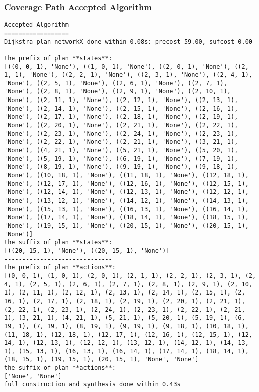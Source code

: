 \subsubsection*{Coverage Path Accepted Algorithm}
\begin{lstlisting}
Accepted Algorithm
==================
Dijkstra_plan_networkX done within 0.08s: precost 59.00, sufcost 0.00
------------------------------
the prefix of plan **states**:
[((0, 0, 1), 'None'), ((1, 0, 1), 'None'), ((2, 0, 1), 'None'), ((2, 1, 1), 'None'), ((2, 2, 1), 'None'), ((2, 3, 1), 'None'), ((2, 4, 1), 'None'), ((2, 5, 1), 'None'), ((2, 6, 1), 'None'), ((2, 7, 1), 'None'), ((2, 8, 1), 'None'), ((2, 9, 1), 'None'), ((2, 10, 1), 'None'), ((2, 11, 1), 'None'), ((2, 12, 1), 'None'), ((2, 13, 1), 'None'), ((2, 14, 1), 'None'), ((2, 15, 1), 'None'), ((2, 16, 1), 'None'), ((2, 17, 1), 'None'), ((2, 18, 1), 'None'), ((2, 19, 1), 'None'), ((2, 20, 1), 'None'), ((2, 21, 1), 'None'), ((2, 22, 1), 'None'), ((2, 23, 1), 'None'), ((2, 24, 1), 'None'), ((2, 23, 1), 'None'), ((2, 22, 1), 'None'), ((2, 21, 1), 'None'), ((3, 21, 1), 'None'), ((4, 21, 1), 'None'), ((5, 21, 1), 'None'), ((5, 20, 1), 'None'), ((5, 19, 1), 'None'), ((6, 19, 1), 'None'), ((7, 19, 1), 'None'), ((8, 19, 1), 'None'), ((9, 19, 1), 'None'), ((9, 18, 1), 'None'), ((10, 18, 1), 'None'), ((11, 18, 1), 'None'), ((12, 18, 1), 'None'), ((12, 17, 1), 'None'), ((12, 16, 1), 'None'), ((12, 15, 1), 'None'), ((12, 14, 1), 'None'), ((12, 13, 1), 'None'), ((12, 12, 1), 'None'), ((13, 12, 1), 'None'), ((14, 12, 1), 'None'), ((14, 13, 1), 'None'), ((15, 13, 1), 'None'), ((16, 13, 1), 'None'), ((16, 14, 1), 'None'), ((17, 14, 1), 'None'), ((18, 14, 1), 'None'), ((18, 15, 1), 'None'), ((19, 15, 1), 'None'), ((20, 15, 1), 'None'), ((20, 15, 1), 'None')]
the suffix of plan **states**:
[((20, 15, 1), 'None'), ((20, 15, 1), 'None')]
------------------------------
the prefix of plan **actions**:
[(0, 0, 1), (1, 0, 1), (2, 0, 1), (2, 1, 1), (2, 2, 1), (2, 3, 1), (2, 4, 1), (2, 5, 1), (2, 6, 1), (2, 7, 1), (2, 8, 1), (2, 9, 1), (2, 10, 1), (2, 11, 1), (2, 12, 1), (2, 13, 1), (2, 14, 1), (2, 15, 1), (2, 16, 1), (2, 17, 1), (2, 18, 1), (2, 19, 1), (2, 20, 1), (2, 21, 1), (2, 22, 1), (2, 23, 1), (2, 24, 1), (2, 23, 1), (2, 22, 1), (2, 21, 1), (3, 21, 1), (4, 21, 1), (5, 21, 1), (5, 20, 1), (5, 19, 1), (6, 19, 1), (7, 19, 1), (8, 19, 1), (9, 19, 1), (9, 18, 1), (10, 18, 1), (11, 18, 1), (12, 18, 1), (12, 17, 1), (12, 16, 1), (12, 15, 1), (12, 14, 1), (12, 13, 1), (12, 12, 1), (13, 12, 1), (14, 12, 1), (14, 13, 1), (15, 13, 1), (16, 13, 1), (16, 14, 1), (17, 14, 1), (18, 14, 1), (18, 15, 1), (19, 15, 1), (20, 15, 1), 'None', 'None']
the suffix of plan **actions**:
['None', 'None']
full construction and synthesis done within 0.43s 
\end{lstlisting}

